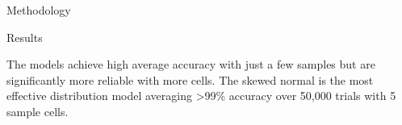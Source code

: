 \documentclass[a0paper,portrait]{baposter}
\begin{document}
\begin{poster}
\begin{posterbox}[name=method,span=2,column=1,below=intro]{Methodology}
\end{posterbox}

\begin{posterbox}[name=results,span=2,column=1,below=method]{Results}
  
\begin{minipage}[t]{0.235\linewidth}
  \vspace{0pt}
  
\end{minipage}
\begin{minipage}[t]{0.285\linewidth}
  \vspace{0pt}
  
\end{minipage}
\begin{minipage}[t]{0.23\linewidth}
  \vspace{0pt}
  
\end{minipage}
\begin{minipage}[t]{0.23\linewidth}
  \vspace{-5pt}
  
\end{minipage}


\begin{minipage}[t]{0.5\linewidth}
  \vspace{-2.5pt}
  \begin{description}
  The models achieve high average accuracy with just a few samples but are significantly more reliable with more cells. 
  The skewed normal is the most effective distribution model averaging >99\% accuracy over 50,000 trials with 5 sample cells. 
  \end{description}
\end{minipage}
\begin{minipage}[t]{0.5\linewidth}
  \vspace{5pt}
  
\end{minipage}

\end{posterbox}


\end{poster}
\end{document}
